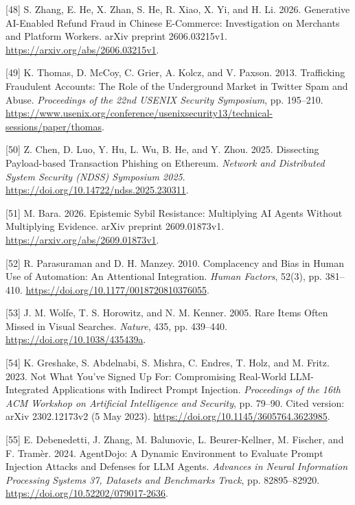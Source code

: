 \documentclass[acmlarge,nonacm]{acmart}
\newlength{\cslhangindent}
\newlength{\cslentryspacingunit} %
\newenvironment{CSLReferences}[2] %
 {\bibliofont %
  \setlength{\parindent}{0pt}
  \ifodd #1
  \let\oldpar\par
  \def\par{\hangindent=\cslhangindent\oldpar}
  \fi
  \setlength{\parskip}{#2\cslentryspacingunit}
 }%
 {}
\begin{document}
\begin{CSLReferences}{1}{1}
\leavevmode{}%
{[}48{]} S. Zhang, E. He, X. Zhan, S. He, R. Xiao, X. Yi, and H. Li.
2026. Generative AI-Enabled Refund Fraud in Chinese E-Commerce:
Investigation on Merchants and Platform Workers. arXiv preprint
2606.03215v1. \url{https://arxiv.org/abs/2606.03215v1}.

\leavevmode{}%
{[}49{]} K. Thomas, D. McCoy, C. Grier, A. Kolcz, and V. Paxson. 2013.
Trafficking Fraudulent Accounts: The Role of the Underground Market in
Twitter Spam and Abuse. \emph{Proceedings of the 22nd USENIX Security
Symposium}, pp. 195--210.
\url{https://www.usenix.org/conference/usenixsecurity13/technical-sessions/paper/thomas}.

\leavevmode{}%
{[}50{]} Z. Chen, D. Luo, Y. Hu, L. Wu, B. He, and Y. Zhou. 2025.
Dissecting Payload-based Transaction Phishing on Ethereum. \emph{Network
and Distributed System Security (NDSS) Symposium 2025}.
\url{https://doi.org/10.14722/ndss.2025.230311}.

\leavevmode{}%
{[}51{]} M. Bara. 2026. Epistemic Sybil Resistance: Multiplying AI
Agents Without Multiplying Evidence. arXiv preprint 2609.01873v1.
\url{https://arxiv.org/abs/2609.01873v1}.

\leavevmode{}%
{[}52{]} R. Parasuraman and D. H. Manzey. 2010. Complacency and Bias in
Human Use of Automation: An Attentional Integration. \emph{Human
Factors}, 52(3), pp. 381--410.
\url{https://doi.org/10.1177/0018720810376055}.

\leavevmode{}%
{[}53{]} J. M. Wolfe, T. S. Horowitz, and N. M. Kenner. 2005. Rare Items
Often Missed in Visual Searches. \emph{Nature}, 435, pp. 439--440.
\url{https://doi.org/10.1038/435439a}.

\leavevmode{}%
{[}54{]} K. Greshake, S. Abdelnabi, S. Mishra, C. Endres, T. Holz, and
M. Fritz. 2023. Not What You've Signed Up For: Compromising Real-World
LLM-Integrated Applications with Indirect Prompt Injection.
\emph{Proceedings of the 16th ACM Workshop on Artificial Intelligence
and Security}, pp. 79--90. Cited version: arXiv 2302.12173v2 (5 May
2023). \url{https://doi.org/10.1145/3605764.3623985}.

\leavevmode{}%
{[}55{]} E. Debenedetti, J. Zhang, M. Balunovic, L. Beurer-Kellner, M.
Fischer, and F. Tramèr. 2024. AgentDojo: A Dynamic Environment to
Evaluate Prompt Injection Attacks and Defenses for LLM Agents.
\emph{Advances in Neural Information Processing Systems 37, Datasets and
Benchmarks Track}, pp. 82895--82920.
\url{https://doi.org/10.52202/079017-2636}.


\end{CSLReferences}
\end{document}
